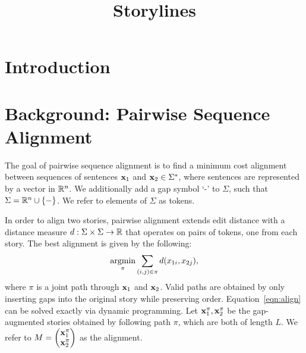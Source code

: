 \documentclass{article}
\title{Storylines}
\begin{document}
\maketitle

\section{Introduction}

\section{Background: Pairwise Sequence Alignment}
The goal of pairwise sequence alignment is to find a minimum cost alignment
between sequences of sentences $\mathbf{x}_1$ and $\mathbf{x}_2\in\Sigma^*$, where
sentences are represented by a vector in $\mathbb{R}^n$.
We additionally add a gap symbol `-' to $\Sigma$, such that 
$\Sigma = \mathbb{R}^n \cup \left\{-\right\}$.
We refer to elements of $\Sigma$ as tokens.

In order to align two stories, pairwise alignment extends edit distance
with a distance measure $d: \Sigma\times\Sigma\to\mathbb{R}$ that operates on pairs of tokens,
one from each story.
The best alignment is given by the following:
\begin{equation}
\label{eqn:align}
\operatorname*{argmin}_\pi \sum_{(i, j) \in \pi} d(x_{1i},x_{2j}),
\end{equation}
where $\pi$ is a joint path through $\mathbf{x}_1$ and $\mathbf{x}_2$.
Valid paths are obtained by only inserting gaps into the original story
while preserving order.
Equation~\ref{eqn:align} can be solved exactly via dynamic programming.
Let $\mathbf{x}^\pi_1,\mathbf{x}^\pi_2$ be the gap-augmented stories obtained by following path $\pi$,
which are both of length $L$.
We refer to 
$M = \begin{pmatrix}\mathbf{x}^\pi_1 \\ \mathbf{x}^\pi_2 \end{pmatrix}$
as the alignment.
\end{document}
